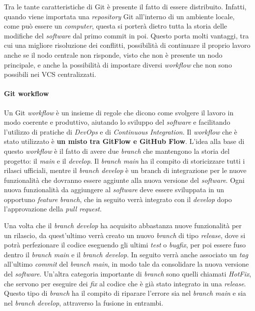 Tra le tante caratteristiche di Git è presente il fatto di essere distribuito. Infatti, quando viene importata una \textit{repository} Git all'interno di un ambiente locale, come può essere un \textit{computer}, questa si porterà dietro tutta la storia delle modifiche del \textit{software} dal primo commit in poi. Questo porta molti vantaggi, tra cui una migliore risoluzione dei conflitti, possibilità di continuare il proprio lavoro anche se il nodo centrale non risponde, visto che non è presente un nodo principale, e anche la possibilità di impostare diversi \textit{workflow} che non sono possibili nei VCS centralizzati. 

\paragraph{Git workflow}
Un Git \textit{workflow} è un insieme di regole che dicono come svolgere il lavoro in modo coerente e produttivo,  aiutando lo sviluppo del \textit{software} e facilitando l'utilizzo di pratiche di \textit{DevOps} e di \textit{Continuous Integration}. Il \textit{workflow} che è stato utilizzato è \textbf{un misto tra GitFlow e GitHub Flow}.
L'idea alla base di questo \textit{workflow} è il fatto di avere due \textit{branch} che mantengono la storia del progetto: il \textit{main} e il \textit{develop}. Il \textit{branch main} ha il compito di storicizzare tutti i rilasci ufficiali, mentre il \textit{branch develop} è un branch di integrazione per le nuove funzionalità che dovranno essere aggiunte alla nuova versione del \textit{software}. Ogni nuova funzionalità da aggiungere al \textit{software} deve essere sviluppata in un opportuno \textit{feature branch}, che in seguito verrà integrato con il \textit{develop} dopo l'approvazione della \textit{pull request}.

Una volta che il \textit{branch develop} ha acquisito abbastanza nuove funzionalità per un rilascio, da quest'ultimo verrà creato un nuovo \textit{branch} di tipo \textit{release}, dove si potrà perfezionare il codice eseguendo gli ultimi \textit{test} o \textit{bugfix}, per poi essere fuso dentro il \textit{branch main} e il \textit{branch develop}. In seguito verrà anche associato un \textit{tag} all'ultimo \textit{commit} del \textit{branch main}, in modo tale da consolidare la nuova versione del \textit{software}.
Un'altra categoria importante di \textit{branch} sono quelli chiamati \textit{HotFix}, che servono per eseguire dei \textit{fix} al codice che è già stato integrato in una \textit{release}. Questo tipo di \textit{branch} ha il compito di riparare l'errore sia nel \textit{branch main} e sia nel \textit{branch develop}, attraverso la fusione in entrambi.

